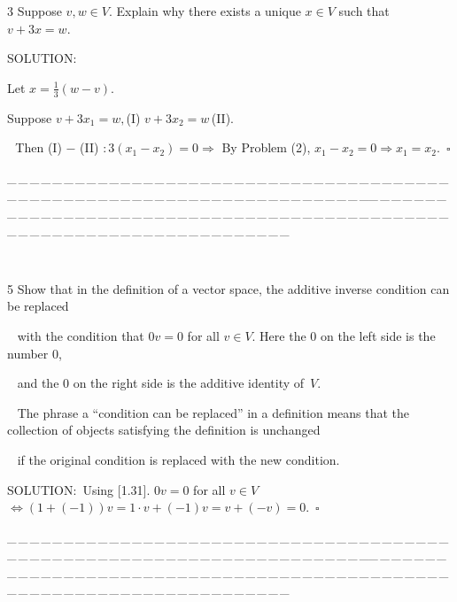 \documentclass[a4paper, 11pt, UTF8]{article}
\begin{document}
\begin{large}
{\timesbf\Large 3} {\timessl\Large 
Suppose $v, w\in V$. Explain why there exists a unique $x\in V$ such that $v + 3x = w$.
}\par
{\timesbf S\footnotesize{OLUTION:}}\par\quad
[Existence] Let $x=\displaystyle\frac{1}{3}(w-v)$.\par\quad
[Uniqueness] Suppose $v+3x_1=w,$(I)$\,\,v+3x_2=w\,$(II).\par\quad\quad\qquad\qquad\,\, Then (I) $-$ (II) $: 3(x_1-x_2)=0\Rightarrow$ By Problem (2), $x_1-x_2=0\Rightarrow x_1=x_2.\,\,\,\square$\par
{\tiny \_\,\_\,\_\,\_\,\_\,\_\,\_\,\_\,\_\,\_\,\_\,\_\,\_\,\_\,\_\,\_\,\_\,\_\,\_\,\_\,\_\,\_\,\_\,\_\,\_\,\_\,\_\,\_\,\_\,\_\,\_\,\_\,\_\,\_\,\_\,\_\,\_\,\_\,\_\,\_\,\_\,\_\,\_\,\_\,\_\,\_\,\_\,\_\,\_\,\_\,\_\,\_\,\_\,\_\,\_\,\_\,\_\,\_\,\_\,\_\,\_\,\_\,\_\,\_\,\_\,\_\,\_\,\_\,\_\,\_\,\_\_\,\_\,\_\,\_\,\_\,\_\,\_\,\_\,\_\,\_\,\_\,\_\,\_\,\_\,\_\,\_\,\_\,\_\,\_\,\_\,\_\,\_\,\_\,\_\,\_\,\_\,\_\,\_\,\_\,\_\,\_\,\_\,\_\,\_\,\_\,\_\,\_\,\_\,\_\,\_\,\_\,\_\,\_\,\_\,\_\,\_\,\_\,\_\,\_\,\_\,\_\,\_\,\_\,\_\,\_\,\_\,\_\,\_\,\_\,\_\,\_\,\_\,\_\,\_\,\_\,\_\,\_\,\_\,\_\,\_\,\_}{\tiny\,\par}

{\timesbf\Large 5} {\timessl\Large 
Show that in the definition of a vector space, the additive inverse condition can be replaced}\par\,\,\,
{\timessl\Large with the condition that $0v = 0$ for all $v\in V$. Here the $0$ on the left side is the number $0$, }\par\,\,\,
{\timessl\Large and the $0$ on the right side is the additive identity of \,$V$.
}\par\,\,\,
{\timessl\small The phrase a “condition can be replaced” in a definition means that the collection of objects satisfying the definition is unchanged}\par\,\,\,
{\timessl\small if the original condition is replaced with the new condition.}\par
{\timesbf S\footnotesize{OLUTION:}}\,\,\,Using [1.31]. $0v = 0$ for all $v\in V$ $\Leftrightarrow (1+(-1))v=1\cdot v+(-1)v=v+(-v)=0.\,\,\,\square$\par
{\tiny \_\,\_\,\_\,\_\,\_\,\_\,\_\,\_\,\_\,\_\,\_\,\_\,\_\,\_\,\_\,\_\,\_\,\_\,\_\,\_\,\_\,\_\,\_\,\_\,\_\,\_\,\_\,\_\,\_\,\_\,\_\,\_\,\_\,\_\,\_\,\_\,\_\,\_\,\_\,\_\,\_\,\_\,\_\,\_\,\_\,\_\,\_\,\_\,\_\,\_\,\_\,\_\,\_\,\_\,\_\,\_\,\_\,\_\,\_\,\_\,\_\,\_\,\_\,\_\,\_\,\_\,\_\,\_\,\_\,\_\,\_\_\,\_\,\_\,\_\,\_\,\_\,\_\,\_\,\_\,\_\,\_\,\_\,\_\,\_\,\_\,\_\,\_\,\_\,\_\,\_\,\_\,\_\,\_\,\_\,\_\,\_\,\_\,\_\,\_\,\_\,\_\,\_\,\_\,\_\,\_\,\_\,\_\,\_\,\_\,\_\,\_\,\_\,\_\,\_\,\_\,\_\,\_\,\_\,\_\,\_\,\_\,\_\,\_\,\_\,\_\,\_\,\_\,\_\,\_\,\_\,\_\,\_\,\_\,\_\,\_\,\_\,\_\,\_\,\_\,\_\,\_}{\tiny\,\par}


\end{large}
\end{document}
